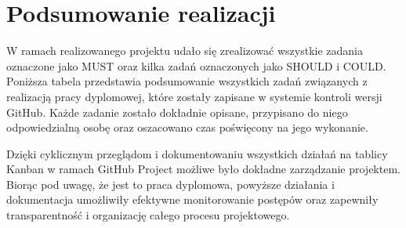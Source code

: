     \section{Podsumowanie realizacji}
    \label{sec:podsumowanie realizacji}
    W ramach realizowanego projektu udało się zrealizować wszystkie zadania oznaczone jako MUST oraz kilka zadań oznaczonych jako SHOULD i COULD. 
    Poniższa tabela przedstawia podsumowanie wszystkich zadań związanych z realizacją pracy dyplomowej, które zostały zapisane w systemie kontroli wersji GitHub. 
    Każde zadanie zostało dokładnie opisane, przypisano do niego odpowiedzialną osobę oraz oszacowano czas poświęcony na jego wykonanie.

    Dzięki cyklicznym przeglądom i dokumentowaniu wszystkich działań na tablicy Kanban w ramach GitHub Project możliwe było 
    dokładne zarządzanie projektem. Biorąc pod uwagę, że jest to praca dyplomowa, powyższe działania i dokumentacja umożliwiły efektywne monitorowanie postępów oraz zapewniły 
    transparentność i organizację całego procesu projektowego.

